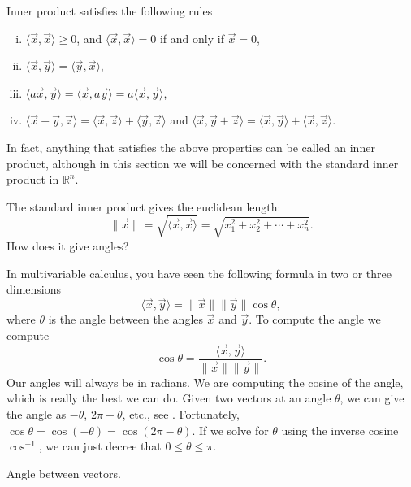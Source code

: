 Inner product satisfies the following rules
\begin{enumerate}[(i)]
\item $\langle \vec{x} , \vec{x} \rangle \geq 0$, and
$\langle \vec{x} , \vec{x} \rangle = 0$ if and only if $\vec{x} = 0$,
\item $\langle \vec{x} , \vec{y} \rangle = \langle \vec{y} , \vec{x}
\rangle$,
\item $\langle a\vec{x} , \vec{y} \rangle =
\langle \vec{x} , a\vec{y} \rangle =
a \langle \vec{x} , \vec{y} \rangle$,
\item $\langle \vec{x} +  \vec{y} , \vec{z} \rangle =
\langle \vec{x} , \vec{z} \rangle +
\langle \vec{y} , \vec{z} \rangle$ and
$\langle \vec{x}, \vec{y} + \vec{z} \rangle =
\langle \vec{x} , \vec{y} \rangle +
\langle \vec{x} , \vec{z} \rangle$.
\end{enumerate}
In fact, anything that satisfies the above properties can be called an inner
product, although in this section we will be concerned with the
standard inner product in ${\mathbb{R}}^n$.

\medskip

The standard inner product gives the euclidean length:
\begin{equation*}
\lVert{\vec{x}}\rVert = \sqrt{\langle \vec{x}, \vec{x} \rangle}
= \sqrt{x_1^2 + x_2^2 + \cdots + x_n^2} .
\end{equation*}
How does it give angles?

In multivariable calculus, you have seen the 
following formula in two or three dimensions
\begin{equation*}
\langle \vec{x}, \vec{y} \rangle
=
\lVert{\vec{x}}\rVert \lVert{\vec{y}}\rVert \cos \theta,
\end{equation*}
where $\theta$ is the angle between the angles $\vec{x}$ and $\vec{y}$.  To
compute the angle we compute
\begin{equation*}
\cos \theta
=
\frac{\langle \vec{x}, \vec{y} \rangle}{\lVert{\vec{x}}\rVert
\lVert{\vec{y}}\rVert} .
\end{equation*}
Our angles will always be in radians.
We are computing the cosine of the angle,
which is really the best
we can do.  Given two vectors at an angle $\theta$, we can give the angle as
$-\theta$, $2\pi-\theta$, etc.,
see .
Fortunately,
$\cos \theta = \cos (-\theta) = \cos(2\pi - \theta)$.
If we solve for $\theta$ using the inverse cosine $\cos^{-1}$,
we can just decree that $0 \leq \theta \leq \pi$.
\begin{myfig}
\capstart
{}
\caption{Angle between vectors.\label{vec-angle:fig}}
\end{myfig}


